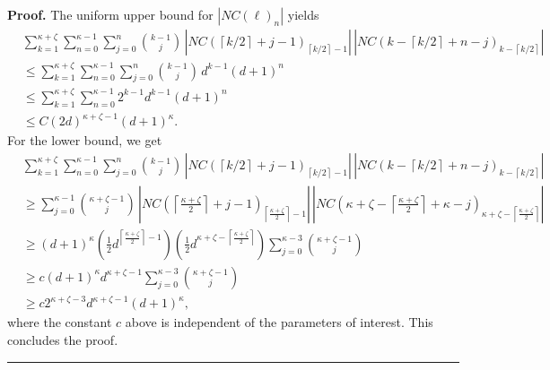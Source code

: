 \documentclass{article}%
\newenvironment{proof}[1][Proof]{\noindent\textbf{#1.} }{\ \rule{0.5em}{0.5em}}
\newcommand{\ceil}[1]{\left \lceil {#1}\right \rceil}
\begin{document}
\begin{proof} 
The uniform upper bound for $|NC(\ell)_n|$ yields
\begin{align*}
&\sum_{k=1}^{\kappa + \zeta}
\sum_{n=0}^{\kappa-1}
\sum_{j=0}^{n} 
\binom{k-1}{j}\, 
\left| NC\left(\ceil{k/2} + j - 1\right)_{\ceil {k/2}-1}\right|
\, 
\left|NC\left(k- \ceil{k/2}  + n - j\right)_{k -\ceil{k/2}}\right| \\
&\leq \sum_{k=1}^{\kappa + \zeta}
\sum_{n=0}^{\kappa-1}
\sum_{j=0}^{n} 
\binom{k-1}{j}\, d^{k-1}(d+1)^{n} \\
&\leq \sum_{k=1}^{\kappa + \zeta}
\sum_{n=0}^{\kappa-1}
2^{k-1} d^{k-1}(d+1)^{n} \\
&\leq
C (2d)^{\kappa + \zeta-1} (d+1)^\kappa.
\end{align*}
For the lower bound, we get
\begin{align*}
&\sum_{k=1}^{\kappa + \zeta}
\sum_{n=0}^{\kappa-1}
\sum_{j=0}^{n} 
\binom{k-1}{j}\, 
\left| NC\left(\ceil{k/2} + j - 1\right)_{\ceil{k/2}-1}\right|
\, 
\left|NC\left(k- \ceil{k/2}  + n - j\right)_{k -\ceil{k/2}}\right| \\
&\geq \sum_{j=0}^{\kappa-1}
\binom{\kappa+\zeta-1}{j}\,
\left|NC\left(\ceil{\frac{\kappa+\zeta}{2}} + j - 1\right)_{\ceil{\frac{\kappa+\zeta}{2}}-1} \right|
\, \left|
NC\left(\kappa + \zeta -\ceil{\frac{\kappa+\zeta}{2}}  + \kappa - j\right)_{\kappa + \zeta-\ceil{\frac{\kappa+\zeta}{2}}} \right| \\
&\geq (d+ 1)^{\kappa} \left( \frac{1}{2} d^{\ceil{\frac{\kappa + \zeta}{2}}-1} \right) \left( \frac{1}{2} d^{{\kappa + \zeta - \ceil{\frac{\kappa + \zeta}{2}}}} \right) \sum_{j=0}^{\kappa-3} \binom{\kappa+\zeta-1}{j} \\
&\geq c (d+ 1)^{\kappa} d^{\kappa + \zeta -1} \sum_{j=0}^{\kappa-3} \binom{\kappa+\zeta-1}{j} \\
&\geq c 2^{\kappa + \zeta -  3} d^{\kappa+\zeta -1} (d+ 1)^{\kappa},
\end{align*}
where the  constant $c$ above is independent of the parameters of interest.\newline
This concludes the proof.
\end{proof}
\end{document}
